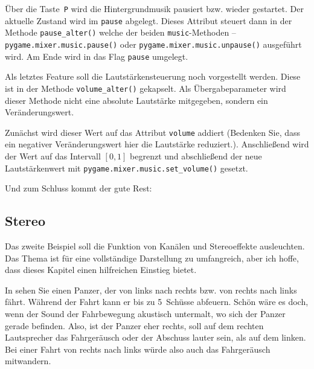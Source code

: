 Über die Taste~\texttt{P} wird die Hintergrundmusik pausiert bzw. wieder gestartet. Der aktuelle Zustand wird im \texttt{pause} abgelegt. Dieses Attribut steuert dann in der Methode \texttt{pause\_alter()} welche der beiden \texttt{music}-Methoden --  \texttt{pygame.mixer.music.pause()} oder \texttt{pygame.mixer.music.unpause()} ausgeführt wird. Am Ende wird in  das Flag \texttt{pause} umgelegt.


Als letztes Feature soll die Lautstärkensteuerung noch vorgestellt werden. Diese ist in der Methode \texttt{volume\_alter()} gekapselt. Als Übergabeparameter wird dieser Methode nicht eine absolute Lautstärke mitgegeben, sondern ein Veränderungswert. 

Zunächst wird dieser Wert auf das Attribut \texttt{volume} addiert (Bedenken Sie, dass ein negativer Veränderungswert hier die Lautstärke reduziert.). Anschließend wird der Wert auf das Intervall $[0, 1]$ begrenzt und abschließend der neue Lautstärkenwert mit \texttt{pygame.mixer\-.music\-.set\-\_volume()} gesetzt.


\newpage
Und zum Schluss kommt der gute Rest:


\subsection{Stereo}

Das zweite Beispiel soll die Funktion von Kanälen und \Acrshort{Stereo}effekte ausleuchten. Das Thema ist für eine vollständige Darstellung zu umfangreich, aber ich hoffe, dass dieses Kapitel einen hilfreichen Einstieg bietet.

In  sehen Sie einen Panzer, der von links nach rechts bzw. von rechts nach links fährt.  Während der Fahrt kann er bis zu 5~Schüsse abfeuern. Schön wäre es doch, wenn der Sound der Fahrbewegung akustisch untermalt, wo sich der Panzer gerade befinden. Also, ist der Panzer eher rechts, soll auf dem rechten Lautsprecher das Fahrgeräusch oder der Abschuss lauter sein, als auf dem linken. Bei einer Fahrt von rechts nach links würde also auch das Fahrgeräusch mitwandern.



